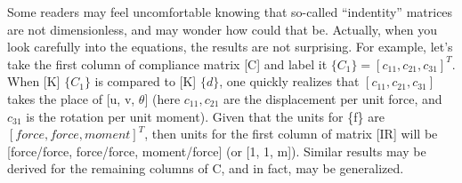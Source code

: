 \vspace{0.15 in}
\noindent\hspace{0.5 in}
Some readers may feel uncomfortable knowing that
so-called ``indentity'' matrices are not dimensionless,
and may wonder how could that be.
Actually, when you look carefully into the equations,
the results are not surprising.
For example, let's take the first column of compliance matrix [C]
and label it $\{C_1\} = [ c_{11}, c_{21}, c_{31} ] ^T $.
When [K] $\{C_1\}$ is compared to [K] $\{d\}$,
one quickly realizes that $ [ c_{11}, c_{21}, c_{31} ]$
takes the place of [u, v, $\theta$] (here $c_{11}, c_{21}$ are
the displacement per unit force, and $c_{31}$ is the rotation per unit moment).
Given that the units for \{f\} are $ [force, force, moment]^T $,
then units for the first column of matrix [IR]
will be [force/force, force/force, moment/force] (or [1, 1, m]).
Similar results may be derived for the remaining columns of C,
and in fact, may be generalized.

